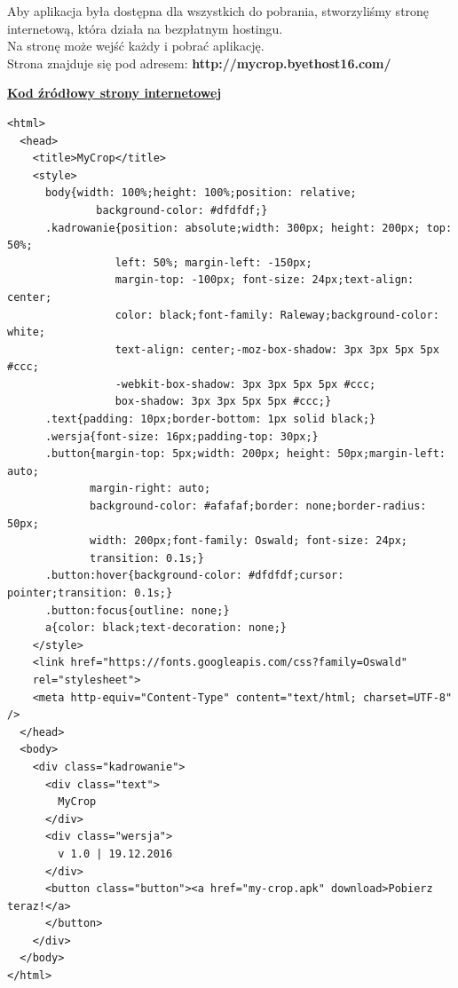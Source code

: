 Aby aplikacja była dostępna dla wszystkich do pobrania, stworzyliśmy stronę internetową, która działa na bezpłatnym hostingu. \\

Na stronę może wejść każdy i pobrać aplikację.\\

Strona znajduje się pod adresem: \textbf{http://mycrop.byethost16.com/}\\

\begin{center}
\underline{\textbf{Kod źródłowy strony internetowej}}
\end{center}

\begin{verbatim}
<html>
  <head>
    <title>MyCrop</title>
    <style>
      body{width: 100%;height: 100%;position: relative;
	          background-color: #dfdfdf;}
      .kadrowanie{position: absolute;width: 300px; height: 200px; top: 50%;
                 left: 50%; margin-left: -150px;
                 margin-top: -100px; font-size: 24px;text-align: center;
                 color: black;font-family: Raleway;background-color: white;
                 text-align: center;-moz-box-shadow: 3px 3px 5px 5px #ccc;
                 -webkit-box-shadow: 3px 3px 5px 5px #ccc;
                 box-shadow: 3px 3px 5px 5px #ccc;}
      .text{padding: 10px;border-bottom: 1px solid black;}
      .wersja{font-size: 16px;padding-top: 30px;}
      .button{margin-top: 5px;width: 200px; height: 50px;margin-left: auto;
             margin-right: auto;
             background-color: #afafaf;border: none;border-radius: 50px;
             width: 200px;font-family: Oswald; font-size: 24px;
             transition: 0.1s;}
      .button:hover{background-color: #dfdfdf;cursor: pointer;transition: 0.1s;}
      .button:focus{outline: none;}
      a{color: black;text-decoration: none;}
    </style>
    <link href="https://fonts.googleapis.com/css?family=Oswald" 
    rel="stylesheet">
    <meta http-equiv="Content-Type" content="text/html; charset=UTF-8" />
  </head>
  <body>
    <div class="kadrowanie">
      <div class="text">
        MyCrop
      </div>
      <div class="wersja">
        v 1.0 | 19.12.2016
      </div>
      <button class="button"><a href="my-crop.apk" download>Pobierz teraz!</a>
      </button>
    </div>
  </body>
</html>

\end{verbatim}
